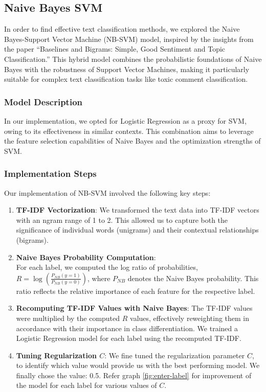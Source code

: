 \subsection{Naive Bayes SVM}

In order to find effective text classification methods, we explored the Naive Bayes-Support Vector Machine (NB-SVM) model, inspired by the insights from the paper ``Baselines and Bigrams: Simple, Good Sentiment and Topic Classification.'' This hybrid model combines the probabilistic foundations of Naive Bayes with the robustness of Support Vector Machines, making it particularly suitable for complex text classification tasks like toxic comment classification.


\subsubsection{Model Description}
In our implementation, we opted for Logistic Regression as a proxy for SVM, owing to its effectiveness in similar contexts. This combination aims to leverage the feature selection capabilities of Naive Bayes and the optimization strengths of SVM.

\subsubsection{Implementation Steps}
Our implementation of NB-SVM involved the following key steps:

\begin{enumerate}
  \item \textbf{TF-IDF Vectorization}: We transformed the text data into TF-IDF vectors with an ngram range of 1 to 2. This allowed us to capture both the significance of individual words (unigrams) and their contextual relationships (bigrams).
  
  \item \textbf{Naive Bayes Probability Computation}: \\
  For each label, we computed the log ratio of probabilities, $R = \log\left(\frac{P_{NB}(y = 1)}{P_{NB}(y = 0)}\right)$, where $P_{NB}$ denotes the Naive Bayes probability. This ratio reflects the relative importance of each feature for the respective label.
  
  \item \textbf{Recomputing TF-IDF Values with Naive Bayes}: The TF-IDF values were multiplied by the computed $R$ values, effectively reweighting them in accordance with their importance in class differentiation. We trained a Logistic Regression model for each label using the recomputed TF-IDF.

  \item \textbf{Tuning Regularization $C$}: We fine tuned the regularization parameter $C$, to identify which value would provide us with the best performing model. We finally chose the value: 0.5. Refer graph \ref{fig:enter-label} for improvement of the model for each label for various values of $C$.
\end{enumerate}

